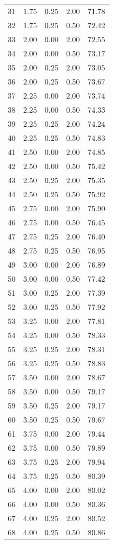 \begin{tabular}{rrrrr}
  31 & 1.75 & 0.25 & 2.00 & 71.78 \\ 
  32 & 1.75 & 0.25 & 0.50 & 72.42 \\ 
  33 & 2.00 & 0.00 & 2.00 & 72.55 \\ 
  34 & 2.00 & 0.00 & 0.50 & 73.17 \\ 
  35 & 2.00 & 0.25 & 2.00 & 73.05 \\ 
  36 & 2.00 & 0.25 & 0.50 & 73.67 \\ 
  37 & 2.25 & 0.00 & 2.00 & 73.74 \\ 
  38 & 2.25 & 0.00 & 0.50 & 74.33 \\ 
  39 & 2.25 & 0.25 & 2.00 & 74.24 \\ 
  40 & 2.25 & 0.25 & 0.50 & 74.83 \\ 
  41 & 2.50 & 0.00 & 2.00 & 74.85 \\ 
  42 & 2.50 & 0.00 & 0.50 & 75.42 \\ 
  43 & 2.50 & 0.25 & 2.00 & 75.35 \\ 
  44 & 2.50 & 0.25 & 0.50 & 75.92 \\ 
  45 & 2.75 & 0.00 & 2.00 & 75.90 \\ 
  46 & 2.75 & 0.00 & 0.50 & 76.45 \\ 
  47 & 2.75 & 0.25 & 2.00 & 76.40 \\ 
  48 & 2.75 & 0.25 & 0.50 & 76.95 \\ 
  49 & 3.00 & 0.00 & 2.00 & 76.89 \\ 
  50 & 3.00 & 0.00 & 0.50 & 77.42 \\ 
  51 & 3.00 & 0.25 & 2.00 & 77.39 \\ 
  52 & 3.00 & 0.25 & 0.50 & 77.92 \\ 
  53 & 3.25 & 0.00 & 2.00 & 77.81 \\ 
  54 & 3.25 & 0.00 & 0.50 & 78.33 \\ 
  55 & 3.25 & 0.25 & 2.00 & 78.31 \\ 
  56 & 3.25 & 0.25 & 0.50 & 78.83 \\ 
  57 & 3.50 & 0.00 & 2.00 & 78.67 \\ 
  58 & 3.50 & 0.00 & 0.50 & 79.17 \\ 
  59 & 3.50 & 0.25 & 2.00 & 79.17 \\ 
  60 & 3.50 & 0.25 & 0.50 & 79.67 \\ 
  61 & 3.75 & 0.00 & 2.00 & 79.44 \\ 
  62 & 3.75 & 0.00 & 0.50 & 79.89 \\ 
  63 & 3.75 & 0.25 & 2.00 & 79.94 \\ 
  64 & 3.75 & 0.25 & 0.50 & 80.39 \\ 
  65 & 4.00 & 0.00 & 2.00 & 80.02 \\ 
  66 & 4.00 & 0.00 & 0.50 & 80.36 \\ 
  67 & 4.00 & 0.25 & 2.00 & 80.52 \\ 
  68 & 4.00 & 0.25 & 0.50 & 80.86 \\ 
   \hline
\end{tabular}
